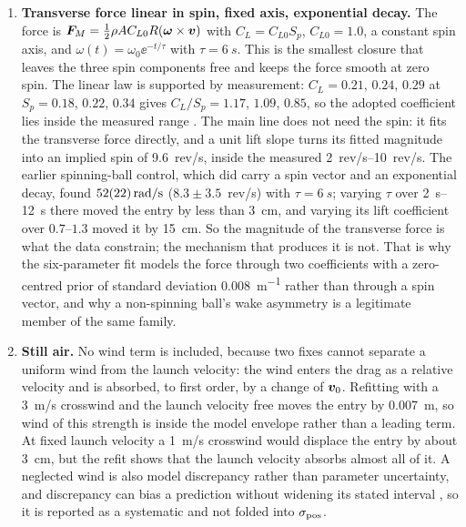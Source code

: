 \begin{enumerate}[label=\textbf{A\arabic*},leftmargin=*,itemsep=6pt]
\item \textbf{Transverse force linear in spin, fixed axis, exponential decay.}
The force is
$\bm{F}_M=\tfrac12\rho A C_{L0}R(\bm{\omega}\times\bm{v})$ with
$C_L=C_{L0}S_p$, $C_{L0}=1.0$, a constant spin axis, and
$\omega(t)=\omega_0\ee^{-t/\tau}$ with $\tau=\SI{6}{s}$. This is the smallest
closure that leaves the three spin components free and keeps the force smooth
at zero spin. The linear law is supported by measurement: $C_L=0.21$, $0.24$,
$0.29$ at $S_p=0.18$, $0.22$, $0.34$ gives $C_L/S_p=1.17$, $1.09$, $0.85$, so
the adopted coefficient lies inside the measured range \citep{asai2020}. The
main line does not need the spin: it fits the transverse force directly, and a
unit lift slope turns its fitted magnitude into an implied spin of
\SI{9.6}{rev/s}, inside the measured \SIrange{2}{10}{rev/s}. The earlier
spinning-ball control, which did carry a spin vector and an exponential decay,
found $\SI{52 \pm 22}{rad/s}$ ($8.3\pm3.5$~rev/s) with $\tau=\SI{6}{s}$; varying
$\tau$ over \SIrange{2}{12}{s} there moved the entry by less than \SI{3}{cm},
and varying its lift coefficient over $0.7$--$1.3$ moved it by \SI{15}{cm}. So
the magnitude of the transverse force is what the data constrain; the
mechanism that produces it is not. That is why the six-parameter fit models the
force through two coefficients with a zero-centred prior of standard deviation
\SI{0.008}{m^{-1}} rather than through a spin vector, and why a non-spinning
ball's wake asymmetry \citep{texier2016} is a legitimate member of the same
family.

\item \textbf{Still air.}
No wind term is included, because two fixes cannot separate a uniform wind
from the launch velocity: the wind enters the drag as a relative velocity and
is absorbed, to first order, by a change of $\bm{v}_0$. Refitting with a
\SI{3}{m/s} crosswind and the launch velocity free moves the entry by
\SI{0.007}{m}, so wind of this strength is inside the model envelope rather
than a leading term. At fixed launch velocity a \SI{1}{m/s} crosswind
would displace the entry by about \SI{3}{cm}, but the refit shows that the
launch velocity absorbs almost all of it. A neglected wind is also model discrepancy rather
than parameter uncertainty, and discrepancy can bias a prediction without
widening its stated interval \citep{white2017}, so it is reported as a
systematic and not folded into $\sigma_{\rm pos}$.


\end{enumerate}
